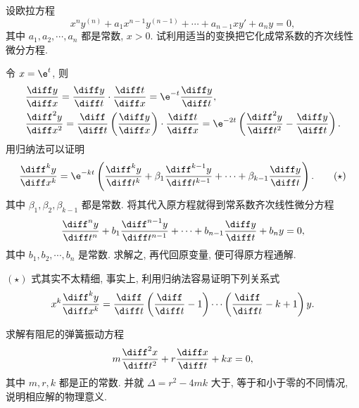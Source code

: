 \begin{exercise}
  设欧拉方程
  \[x^ny^{(n)}+a_1x^{n-1}y^{(n-1)}+\cdots+a_{n-1}xy'+a_ny=0,\]
  其中 $a_1,a_2,\cdots,a_n$ 都是常数, $x>0$. 试利用适当的变换把它化成常系数的齐次线性微分方程.
\end{exercise}

\begin{solve} 
  令 $x=\e^t$, 则
  \begin{align*}
  & \frac{\diff y}{\diff x}=\frac{\diff y}{\diff t}\cdot\frac{\diff t}{\diff x}=\e^{-t}\frac{\diff y}{\diff t}, \\
  & \frac{\diff^2y}{\diff x^2}=\frac{\diff}{\diff t}\left(\frac{\diff y}{\diff x}\right)\cdot\frac{\diff t}{\diff x}=\e^{-2t}\left(\frac{\diff^2y}{\diff t^2}-\frac{\diff y}{\diff t}\right).
  \end{align*}
  用归纳法可以证明
  \begin{equation}
    \frac{\diff^ky}{\diff x^k} = \e^{-kt}\left(\frac{\diff^ky}{\diff t^k}
    + \beta_1\frac{\diff^{k-1}y}{\diff t^{k-1}}
    + \cdots+\beta_{k-1}\frac{\diff y}{\diff t}\right). \tag{$\star$}
  \end{equation}
  其中 $\beta_1,\beta_2,\beta_{k-1}$ 都是常数. 将其代入原方程就得到常系数齐次线性微分方程
  \[\frac{\diff^ny}{\diff t^n}+b_1\frac{\diff^{n-1}y}{\diff t^{n-1}}+\cdots+b_{n-1}\frac{\diff y}{\diff t}+b_ny=0,\]
  其中 $b_1,b_2,\cdots,b_n$ 是常数. 求解之, 再代回原变量, 便可得原方程通解.
\end{solve}

\begin{remark}
  $(\star)$ 式其实不太精细, 事实上, 利用归纳法容易证明下列关系式
  \[x^k\frac{\diff^ky}{\diff x^k}
  = \frac{\diff}{\diff t}\left(\frac{\diff}{\diff t}-1\right)
  \cdots\left(\frac{\diff}{\diff t}-k+1\right)y.\]
\end{remark}


\begin{exercise}
  求解有阻尼的弹簧振动方程
  \[m\frac{\diff^2x}{\diff t^2}+r\frac{\diff x}{\diff t}+kx=0,\]
  其中 $m,r,k$ 都是正的常数. 并就 $\Delta=r^2-4mk$ 大于, 等于和小于零的不同情况, 说明相应解的物理意义.
\end{exercise}

